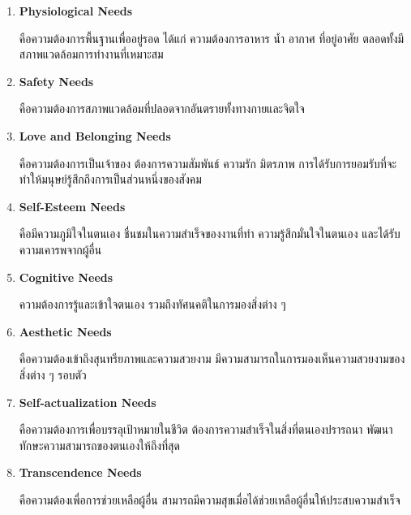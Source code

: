 \documentclass[12pt,oneside,openright,a4paper]{cpe-thai-project}
\begin{document}
\begin{enumerate}
  \item \textbf{Physiological Needs}
  
    คือความต้องการพื้นฐานเพื่ออยู่รอด ได้แก่ ความต้องการอาหาร น้ำ อากาศ 
  ที่อยู่อาศัย ตลอดทั้งมีสภาพแวดล้อมการทำงานที่เหมาะสม

  \item \textbf{Safety Needs}
  
    คือความต้องการสภาพแวดล้อมที่ปลอดจากอันตรายทั้งทางกายและจิตใจ

  \item \textbf{Love and Belonging Needs}
  
    คือความต้องการเป็นเจ้าของ ต้องการความสัมพันธ์ ความรัก มิตรภาพ 
    การได้รับการยอมรับที่จะทำให้มนุษย์รู้สึกถึงการเป็นส่วนหนึ่งของสังคม

  \item \textbf{Self-Esteem Needs}
  
    คือมีความภูมิใจในตนเอง ชื่นชมในความสำเร็จของงานที่ทำ 
    ความรู้สึกมั่นใจในตนเอง และได้รับความเคารพจากผู้อื่น

  \item \textbf{Cognitive Needs}
  
    ความต้องการรู้และเข้าใจตนเอง รวมถึงทัศนคติในการมองสิ่งต่าง ๆ

  \item \textbf{Aesthetic Needs}
  
    คือความต้องเข้าถึงสุนทรียภาพและความสวยงาม 
    มีความสามารถในการมองเห็นความสวยงามของสิ่งต่าง ๆ รอบตัว

  \item \textbf{Self-actualization Needs}
  
    คือความต้องการเพื่อบรรลุเป้าหมายในชีวิต ต้องการความสำเร็จในสิ่งที่ตนเองปรารถนา 
    พัฒนาทักษะความสามารถของตนเองให้ถึงที่สุด

  \item \textbf{Transcendence Needs}
  
    คือความต้องเพื่อการช่วยเหลือผู้อื่น สามารถมีความสุขเมื่อได้ช่วยเหลือผู้อื่นให้ประสบความสำเร็จ
\end{enumerate}

\pagebreak
\end{document}
